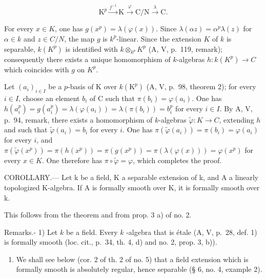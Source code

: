 \[
\mathrm{K} ^ {p} \xrightarrow {f ^ {- 1}} \mathrm{K} \xrightarrow {\varphi} \mathrm{C} / \mathrm{N} \xrightarrow {\lambda} \mathrm{C}.
\]

For every \(x \in K\), one has \(g(x^{p}) = \lambda(\varphi(x))\). Since \(\lambda(\alpha z) = \alpha^{p}\lambda(z)\) for \(\alpha \in k\) and \(z \in C/N\), the map \(g\) is \(k^{p}\)-linear. Since the extension \(K\) of \(k\) is separable, \(k(K^{p})\) is identified with \(k \otimes_{k^{p}} K^{p}\) (A, V, p.~119, remark); consequently there exists a unique homomorphism of \(k\)-algebras \(h: k(K^{p}) \to C\) which coincides with \(g\) on \(K^{p}\).

Let \((a_{i})_{i\in I}\) be a \(p\)-basis of K over \(k(\mathrm{K}^p)\) (A, V, p.~98, theorem 2); for every \(i\in I\), choose an element \(b_{i}\) of C such that \(\pi(b_{i})=\varphi(a_{i})\). One has \(h(a_{i}^{p})=g(a_{i}^{p})=\lambda(\varphi(a_{i}))=\lambda(\pi(b_{i}))=b_{i}^{p}\) for every \(i\in I\). By A, V, p.~94, remark, there exists a homomorphism of \(k\)-algebras \(\tilde{\varphi}:K\to C\), extending \(h\) and such that \(\tilde{\varphi}(a_{i})=b_{i}\) for every \(i\). One has \(\pi(\tilde{\varphi}(a_{i}))=\pi(b_{i})=\varphi(a_{i})\) for every \(i\), and \(\pi(\tilde{\varphi}(x^{p}))=\pi(h(x^{p}))=\pi(g(x^{p}))=\pi(\lambda(\varphi(x)))=\varphi(x^{p})\) for every \(x\in K\). One therefore has \(\pi\circ\tilde{\varphi}=\varphi\), which completes the proof.

COROLLARY.--- Let k be a field, K a separable extension of k, and A a linearly topologized K-algebra. If A is formally smooth over K, it is formally smooth over k.

This follows from the theorem and from prop. 3 a) of no. 2.

Remarks.- 1) Let \(k\) be a field. Every \(k\) -algebra that is étale (A, V, p.~28, def. 1) is formally smooth (loc. cit., p.~34, th. 4, d) and no. 2, prop. 3, b)).

\begin{enumerate}
\def\labelenumi{\arabic{enumi})}
\setcounter{enumi}{1}
\tightlist
\item
  We shall see below (cor. 2 of th. 2 of no. 5) that a field extension which is formally smooth is absolutely regular, hence separable (§ 6, no. 4, example 2).
\end{enumerate}

